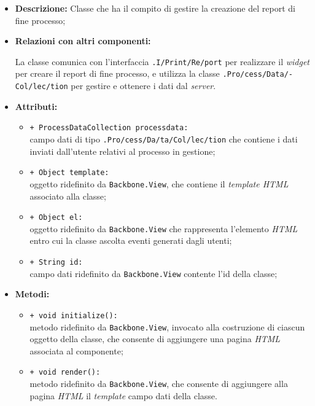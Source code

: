 \begin{flushleft}
\begin{itemize}
\item \textbf{Descrizione:} Classe che ha il compito di gestire la creazione del report di fine processo;
\item \textbf{Relazioni con altri componenti:}
\begin{sloppypar}
La classe comunica con l'interfaccia \texttt{\viewUser{}.I\fshyp{}Print\fshyp{}Re\fshyp{}port} per realizzare il \textit{widget} per creare il report di fine processo, e utilizza la classe \texttt{\collection{}.Pro\fshyp{}cess\fshyp{}Data\fshyp{}Col\fshyp{}lec\fshyp{}tion} per gestire e ottenere i dati dal \textit{server}.
\end{sloppypar}
\item \textbf{Attributi:}
\begin{sloppypar}
\begin{itemize}
\item \texttt{+ ProcessDataCollection processdata:}\\ campo dati di tipo \texttt{\collection{}.Pro\fshyp{}cess\fshyp{}Da\fshyp{}ta\fshyp{}Col\fshyp{}lec\fshyp{}tion} che contiene i dati inviati dall'utente relativi al processo in gestione;
\item \texttt{+ Object template:}\\ oggetto ridefinito da \texttt{Backbone.View}, che contiene il \textit{template HTML} associato alla classe;
\item \texttt{+ Object el:}\\ oggetto ridefinito da \texttt{Backbone.View} che rappresenta l'elemento \textit{HTML} entro cui la classe ascolta eventi generati dagli utenti;
\item \texttt{+ String id:}\\ campo dati ridefinito da \texttt{Backbone.View} contente l'id della classe;
\end{itemize}
\end{sloppypar}
\item \textbf{Metodi:}
\begin{sloppypar}
\begin{itemize}
\item \texttt{+ void initialize():}\\ metodo ridefinito da \texttt{Backbone.View}, invocato alla costruzione di ciascun oggetto della classe, che consente di aggiungere una pagina \textit{HTML} associata al componente;
\item \texttt{+ void render():}\\ metodo ridefinito da \texttt{Backbone.View}, che consente di aggiungere alla pagina \textit{HTML} il \textit{template} campo dati della classe.
\end{itemize}
\end{sloppypar}
\end{itemize}
\end{flushleft}

